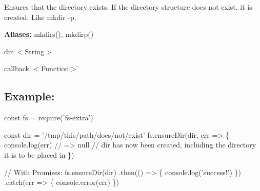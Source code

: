 Ensures that the directory exists. If the directory structure does not exist, it is created. Like {\ttfamily mkdir -\/p}.

{\bfseries Aliases\+:} {\ttfamily mkdirs()}, {\ttfamily mkdirp()}


\begin{DoxyItemize}
\item {\ttfamily dir} {\ttfamily $<$String$>$}
\item {\ttfamily callback} {\ttfamily $<$Function$>$}
\end{DoxyItemize}

\subsection*{Example\+:}


\begin{DoxyCode}
const fs = require('fs-extra')

const dir = '/tmp/this/path/does/not/exist'
fs.ensureDir(dir, err => \{
  console.log(err) // => null
  // dir has now been created, including the directory it is to be placed in
\})

// With Promises:
fs.ensureDir(dir)
.then(() => \{
  console.log('success!')
\})
.catch(err => \{
  console.error(err)
\})
\end{DoxyCode}
 
